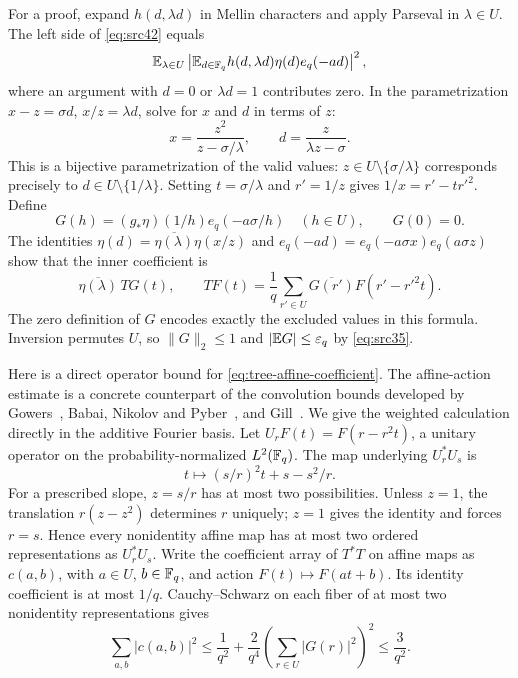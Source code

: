 For a proof, expand $h(d,\lambda d)$ in Mellin characters and apply
Parseval in $\lambda\in U$.  The left side of \eqref{eq:src42} equals
\[
 \mathbb E_{\lambda\in U}
 \left|\mathbb E_{d\in\mathbb F_q}h(d,\lambda d)\eta(d)e_q(-ad)\right|^2,
\]
where an argument with $d=0$ or $\lambda d=1$ contributes zero.
In the parametrization $x-z=\sigma d$, $x/z=\lambda d$, solve for
$x$ and $d$ in terms of $z$:
\[
 x=\frac{z^2}{z-\sigma/\lambda},\qquad
 d=\frac{z}{\lambda z-\sigma}.
\]
This is a bijective parametrization of the valid values:
$z\in U\setminus\{\sigma/\lambda\}$ corresponds precisely to
$d\in U\setminus\{1/\lambda\}$.  Setting
$t=\sigma/\lambda$ and $r'=1/z$ gives
$1/x=r'-tr'^2$.  Define
\[
 G(h)=(g_*\eta)(1/h)e_q(-a\sigma/h)\quad(h\in U),\qquad G(0)=0.
\]
The identities $\eta(d)=\overline{\eta(\lambda)}\eta(x/z)$ and
$e_q(-ad)=e_q(-a\sigma x)e_q(a\sigma z)$ show that the inner
coefficient is
\begin{equation}\label{eq:tree-affine-coefficient}
 \overline{\eta(\lambda)}\,TG(t),\qquad
 TF(t)=\frac1q\sum_{r'\in U}\overline{G(r')}
                                      F(r'-r'^2t).
\end{equation}
The zero definition of $G$ encodes exactly the excluded values in this
formula.  Inversion permutes $U$, so
$\|G\|_2\leq1$ and $|\mathbb E G|\leq\varepsilon_q$ by
\eqref{eq:src35}.

Here is a direct operator bound for \eqref{eq:tree-affine-coefficient}.
The affine-action estimate is a concrete counterpart of the convolution
bounds developed by Gowers~\cite{Gowers2008}, Babai, Nikolov and
Pyber~\cite{BabaiNikolovPyber2008}, and
Gill~\cite[Theorem~2 and Proposition~1.7]{Gill2016}.
We give the weighted calculation directly in the additive Fourier basis.
Let $U_rF(t)=F(r-r^2t)$, a unitary operator on the probability-normalized
$L^2(\mathbb F_q)$.  The map underlying $U_r^*U_s$ is
\[
 t\longmapsto(s/r)^2t+s-s^2/r.
\]
For a prescribed slope, $z=s/r$ has at most two possibilities.  Unless
$z=1$, the translation $r(z-z^2)$ determines $r$ uniquely; $z=1$
gives the identity and forces $r=s$.  Hence every nonidentity affine
map has at most two ordered representations as $U_r^*U_s$.
Write the coefficient array of $T^*T$ on affine maps as $c(a,b)$, with
$a\in U$, $b\in\mathbb F_q$, and action $F(t)\mapsto F(at+b)$.
Its identity coefficient is at most $1/q$.  Cauchy--Schwarz on each
fiber of at most two nonidentity representations gives
\begin{equation}\label{eq:tree-affine-coefficient-norm}
 \sum_{a,b}|c(a,b)|^2
 \leq\frac1{q^2}
       +\frac2{q^4}\left(\sum_{r\in U}|G(r)|^2\right)^2
 \leq\frac3{q^2}.
\end{equation}

